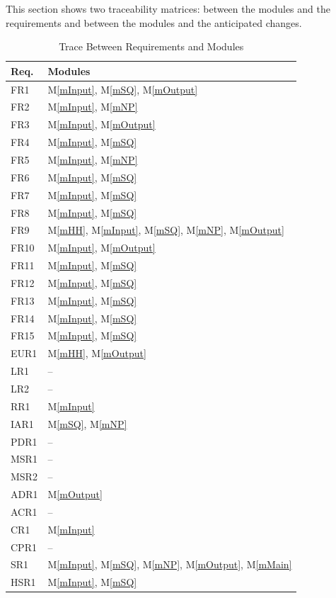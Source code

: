 \documentclass[12pt, titlepage]{article}
\newcommand{\mref}[1]{M\ref{#1}}
\begin{document}
This section shows two traceability matrices: between the modules and the
requirements and between the modules and the anticipated changes.

\begin{table}[H]
\centering
\begin{tabular}{p{} p{}}
\toprule
\textbf{Req.} & \textbf{Modules}\\
\midrule
FR1 & \mref{mInput}, \mref{mSQ}, \mref{mOutput}\\
FR2 & \mref{mInput}, \mref{mNP}\\
FR3 & \mref{mInput}, \mref{mOutput}\\
FR4 & \mref{mInput}, \mref{mSQ}\\
FR5 & \mref{mInput}, \mref{mNP}\\
FR6 & \mref{mInput}, \mref{mSQ}\\
FR7 & \mref{mInput}, \mref{mSQ}\\
FR8 & \mref{mInput}, \mref{mSQ}\\
FR9 & \mref{mHH}, \mref{mInput}, \mref{mSQ}, \mref{mNP}, \mref{mOutput}\\
FR10 & \mref{mInput}, \mref{mOutput}\\
FR11 & \mref{mInput}, \mref{mSQ}\\
FR12 & \mref{mInput}, \mref{mSQ}\\
FR13 & \mref{mInput}, \mref{mSQ}\\
FR14 & \mref{mInput}, \mref{mSQ}\\
FR15 & \mref{mInput}, \mref{mSQ}\\
EUR1 & \mref{mHH}, \mref{mOutput}\\
LR1 & --\\
LR2 & --\\
RR1 & \mref{mInput}\\
IAR1 & \mref{mSQ}, \mref{mNP}\\
PDR1 & --\\
MSR1 & --\\
MSR2 & --\\
ADR1 & \mref{mOutput}\\
ACR1 & --\\
CR1 & \mref{mInput}\\
CPR1 & --\\
SR1 & \mref{mInput}, \mref{mSQ}, \mref{mNP}, \mref{mOutput}, \mref{mMain}\\
HSR1 & \mref{mInput}, \mref{mSQ}\\
\bottomrule
\end{tabular}
\caption{Trace Between Requirements and Modules}
\label{TblRT}
\end{table}
\end{document}
